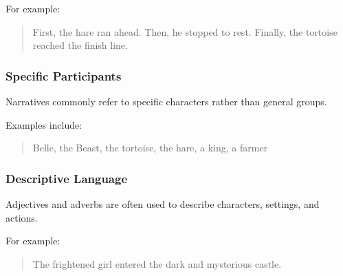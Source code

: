 For example:

\begin{quotation}
  First, the hare ran ahead. Then, he stopped to rest. Finally, the tortoise reached the finish line.
\end{quotation}

\subsubsection{Specific Participants}

Narratives commonly refer to specific characters rather than general groups.


Examples include:

\begin{quotation}
  Belle, the Beast, the tortoise, the hare, a king, a farmer
\end{quotation}

\subsubsection{Descriptive Language}

Adjectives and adverbs are often used to describe characters, settings, and actions.


For example:

\begin{quotation}
  The frightened girl entered the dark and mysterious castle.
\end{quotation}
